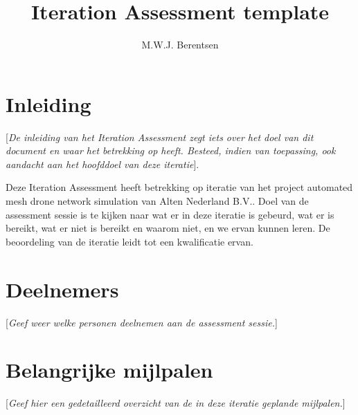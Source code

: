 \documentclass[a4paper, 11pt, oneside]{article}
\author{M.W.J. Berentsen}
\title{Iteration Assessment template}
\begin{document}
	\maketitle
\section{Inleiding}	

{[}\textit{De inleiding van het Iteration Assessment zegt iets over het doel van dit document en waar het betrekking op heeft. Besteed, indien van toepassing, ook aandacht aan het hoofddoel van deze iteratie}{]}.

Deze Iteration Assessment heeft betrekking op iteratie  van het project automated mesh drone network simulation van Alten Nederland B.V.. Doel van de assessment sessie is te kijken naar wat er in deze iteratie is gebeurd, wat er is bereikt, wat er niet is bereikt en waarom niet, en we ervan kunnen leren. De beoordeling van de iteratie leidt tot een kwalificatie ervan.

\section{Deelnemers}
{[}\textit{Geef weer welke personen deelnemen aan de assessment sessie.}{]}

\section{Belangrijke mijlpalen}
{[}\textit{Geef hier een gedetailleerd overzicht van de in deze iteratie geplande mijlpalen.}{]}
\end{document}
